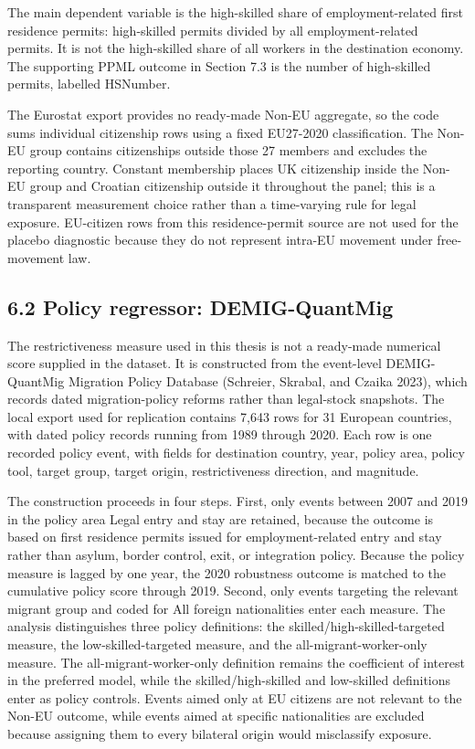 \documentclass[11pt,a4paper]{article}
\begin{document}
The main dependent variable is the high-skilled share of
employment-related first residence permits: high-skilled permits divided
by all employment-related permits. It is not the high-skilled share of
all workers in the destination economy. The supporting PPML outcome in
Section 7.3 is the number of high-skilled permits, labelled HSNumber.

The Eurostat export provides no ready-made Non-EU aggregate, so the code
sums individual citizenship rows using a fixed EU27-2020 classification.
The Non-EU group contains citizenships outside those 27 members and
excludes the reporting country. Constant membership places UK
citizenship inside the Non-EU group and Croatian citizenship outside it
throughout the panel; this is a transparent measurement choice rather
than a time-varying rule for legal exposure. EU-citizen rows from this
residence-permit source are not used for the placebo diagnostic because
they do not represent intra-EU movement under free-movement law.

\subsection{6.2 Policy regressor:
DEMIG-QuantMig}\label{policy-regressor-demig-quantmig}

The restrictiveness measure used in this thesis is not a ready-made
numerical score supplied in the dataset. It is constructed from the
event-level DEMIG-QuantMig Migration Policy Database (Schreier, Skrabal,
and Czaika 2023), which records dated migration-policy reforms rather
than legal-stock snapshots. The local export used for replication
contains 7,643 rows for 31 European countries, with dated policy records
running from 1989 through 2020. Each row is one recorded policy event,
with fields for destination country, year, policy area, policy tool,
target group, target origin, restrictiveness direction, and magnitude.

The construction proceeds in four steps. First, only events between 2007
and 2019 in the policy area Legal entry and stay are retained, because
the outcome is based on first residence permits issued for
employment-related entry and stay rather than asylum, border control,
exit, or integration policy. Because the policy measure is lagged by one
year, the 2020 robustness outcome is matched to the cumulative policy
score through 2019. Second, only events targeting the relevant migrant
group and coded for All foreign nationalities enter each measure. The
analysis distinguishes three policy definitions: the
skilled/high-skilled-targeted measure, the low-skilled-targeted measure,
and the all-migrant-worker-only measure. The all-migrant-worker-only
definition remains the coefficient of interest in the preferred model,
while the skilled/high-skilled and low-skilled definitions enter as
policy controls. Events aimed only at EU citizens are not relevant to
the Non-EU outcome, while events aimed at specific nationalities are
excluded because assigning them to every bilateral origin would
misclassify exposure.
\end{document}
